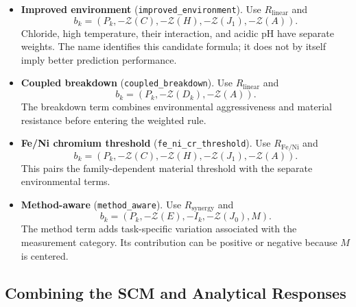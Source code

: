 \documentclass[11pt]{article}
\newenvironment{notes}
  {\begin{itemize}\setlength{\itemsep}{0.45em}\setlength{\parsep}{0pt}}
  {\end{itemize}}
\begin{document}
\begin{notes}
    \item \textbf{Improved environment}
    (\texttt{improved\_environment}).
    Use \(R_{\mathrm{linear}}\) and
    \[
        b_k=(P_k,-\mathcal{Z}(C),-\mathcal{Z}(H),
                   -\mathcal{Z}(J_1),-\mathcal{Z}(A)).
    \]
    Chloride, high temperature, their interaction, and acidic
    pH have separate weights. The name identifies this
    candidate formula; it does not by itself imply better
    prediction performance.

    \item \textbf{Coupled breakdown}
    (\texttt{coupled\_breakdown}).
    Use \(R_{\mathrm{linear}}\) and
    \[
        b_k=(P_k,-\mathcal{Z}(D_k),-\mathcal{Z}(A)).
    \]
    The breakdown term combines environmental aggressiveness
    and material resistance before entering the weighted rule.

    \item \textbf{Fe/Ni chromium threshold}
    (\texttt{fe\_ni\_cr\_threshold}).
    Use \(R_{\mathrm{Fe/Ni}}\) and
    \[
        b_k=(P_k,-\mathcal{Z}(C),-\mathcal{Z}(H),
                   -\mathcal{Z}(J_1),-\mathcal{Z}(A)).
    \]
    This pairs the family-dependent material threshold with
    the separate environmental terms.

    \item \textbf{Method-aware}
    (\texttt{method\_aware}).
    Use \(R_{\mathrm{synergy}}\) and
    \[
        b_k=(P_k,-\mathcal{Z}(E),-I_k,-\mathcal{Z}(J_0),M).
    \]
    The method term adds task-specific variation associated
    with the measurement category. Its contribution can be
    positive or negative because \(M\) is centered.
\end{notes}

\subsection{Combining the SCM and Analytical Responses}
\label{sec:target-mixture}
\end{document}
